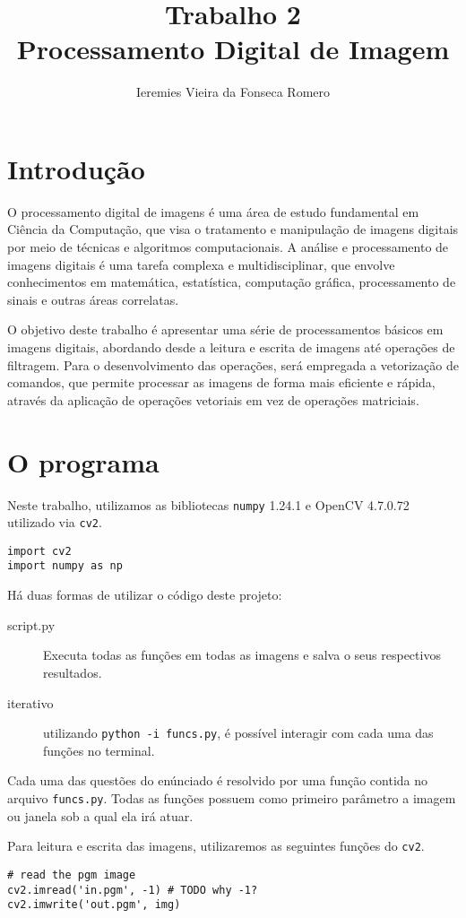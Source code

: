 \documentclass[twocolumn, 10pt]{article}
\author{Ieremies Vieira da Fonseca Romero}
\date{}
\title{Trabalho 2\\\medskip
\large Processamento Digital de Imagem}
\begin{document}
\maketitle


\section*{Introdução}
\label{sec:org0c74d5a}
O processamento digital de imagens é uma área de estudo fundamental em Ciência da Computação, que visa o tratamento e manipulação de imagens digitais por meio de técnicas e algoritmos computacionais.
A análise e processamento de imagens digitais é uma tarefa complexa e multidisciplinar, que envolve conhecimentos em matemática, estatística, computação gráfica, processamento de sinais e outras áreas correlatas.

O objetivo deste trabalho é apresentar uma série de processamentos básicos em imagens digitais, abordando desde a leitura e escrita de imagens até operações de filtragem.
Para o desenvolvimento das operações, será empregada a vetorização de comandos, que permite processar as imagens de forma mais eficiente e rápida, através da aplicação de operações vetoriais em vez de operações matriciais.

\section*{O programa}
\label{sec:org60b6f49}
Neste trabalho, utilizamos as bibliotecas \texttt{numpy} 1.24.1 e OpenCV 4.7.0.72 utilizado via \texttt{cv2}.
\begin{verbatim}
import cv2
import numpy as np
\end{verbatim}

Há duas formas de utilizar o código deste projeto:
\begin{description}
\item[{script.py}] Executa todas as funções em todas as imagens e salva o seus respectivos resultados.
\item[{iterativo}] utilizando \texttt{python -i funcs.py}, é possível interagir com cada uma das funções no terminal.
\end{description}

Cada uma das questões do enúnciado é resolvido por uma função contida no arquivo \texttt{funcs.py}.
Todas as funções possuem como primeiro parâmetro a imagem ou janela sob a qual ela irá atuar.

Para leitura e escrita das imagens, utilizaremos as seguintes funções do \texttt{cv2}.
\begin{verbatim}
# read the pgm image
cv2.imread('in.pgm', -1) # TODO why -1?
cv2.imwrite('out.pgm', img)
\end{verbatim}
\end{document}
